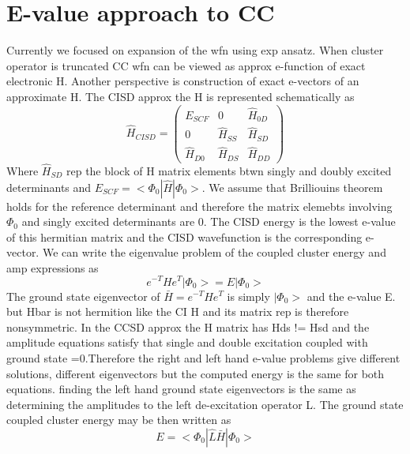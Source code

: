 \documentclass[10pt, draft]{article}
\begin{document}
\section{E-value approach to CC}
Currently we focused on expansion of the wfn using exp ansatz.  When cluster operator is truncated CC wfn can be viewed as approx e-function of exact electronic H.  Another perspective is construction of exact e-vectors of an approximate H.  The CISD approx the H is represented schematically as 
\[ \hat{H}_{CISD}  = 
	\begin{pmatrix}
	E_{SCF} & 0 & \hat{H}_{0D} \\
	0 & \hat{H}_{SS} & \hat{H}_{SD}\\
	\hat{H}_{D0} & \hat{H}_{DS} & \hat{H}_{DD}
	\end{pmatrix} \]
Where $\hat{H}_{SD}$ rep the block of H matrix elements btwn singly and doubly excited determinants and $E_{SCF} = <\Phi_0| \hat{H}|\Phi_0>$.  We assume that Brilliouins theorem holds for the reference determinant and therefore the matrix elemebts involving $\Phi_0$ and singly excited determinants are 0.  The CISD energy is the lowest e-value of this hermitian matrix and the CISD wavefunction is the corresponding e-vector. We can write the eigenvalue problem of the coupled cluster energy and amp expressions as 
\[e^{-T}He^{T} |\Phi_0> = E|\Phi_0> \]
The ground state eigenvector of $\bar{H} = e^{-T}He^{T} $ is simply $|\Phi_0> $ and the e-value E. but Hbar is not hermition like the CI H and its matrix rep is therefore nonsymmetric.  In the CCSD approx the H matrix has Hds != Hsd and the amplitude equations satisfy that single and double excitation coupled with ground state =0.Therefore the right and left hand e-value problems give different solutions, different eigenvectors but the computed energy is the same for both equations.  finding the left hand ground state eigenvectors is the same as determining the amplitudes to the left de-excitation operator L.  The ground state coupled cluster energy may be then written as 
\[E = <\Phi_0| \hat{L}\bar{H} |\Phi_0> \]
\end{document}

